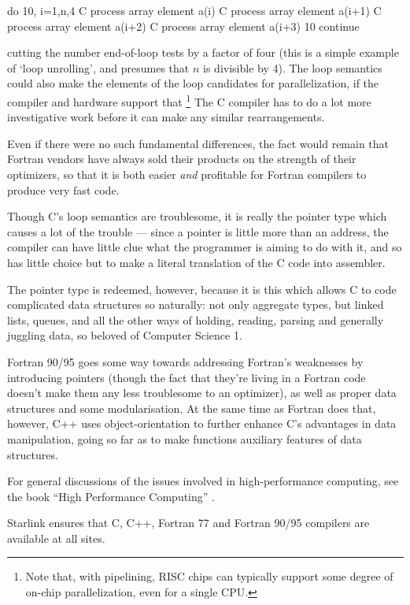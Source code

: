 \documentclass[11pt,oneside,chapters]{starlink}
\begin{document}
\begin{terminalv}
      do 10, i=1,n,4
C     process array element a(i)
C     process array element a(i+1)
C     process array element a(i+2)
C     process array element a(i+3)
   10 continue
\end{terminalv}

cutting the number end-of-loop tests by a factor of four (this is a
simple example of `loop unrolling', and presumes that
$n$ is divisible by 4).  The loop
semantics could also make the elements of the loop
candidates for parallelization, if the compiler and hardware support
that
\footnote{Note that, with pipelining, RISC chips can typically
support some degree of on-chip parallelization, even for a single
CPU.}
The C compiler has to do a lot more investigative work before
it can make any similar rearrangements.

Even if there were no such fundamental differences, the fact would
remain that Fortran vendors have always sold their products on the
strength of their optimizers, so that it is both easier \emph{and}
profitable for Fortran compilers to produce very fast code.

Though C's loop semantics are troublesome, it is really the pointer
type which causes a lot of the trouble --- since a pointer is little
more than an address, the compiler can have little clue what the
programmer is aiming to do with it, and so has little choice but to
make a literal translation of the C code into assembler.

The pointer type is redeemed, however, because it is this which
allows C to code complicated data structures so naturally: not only
aggregate types, but linked lists, queues, and all the other ways of
holding, reading, parsing and generally juggling data, so beloved of
Computer Science 1.

Fortran 90/95 goes some way towards addressing Fortran's
weaknesses by introducing pointers (though the fact that
they're living in a Fortran code doesn't make them any less
troublesome to an optimizer), as well as proper data
structures and some modularisation.  At the same time as
Fortran does that, however, C++ uses object-orientation to
further enhance C's advantages in data manipulation, going
so far as to make functions auxiliary features of data
structures.

For general discussions of the issues involved in high-performance
computing, see the book
``High Performance Computing'' \citep{dowd}.

Starlink ensures that C, C++, Fortran 77 and Fortran 90/95 compilers
are available at all sites.
\end{document}

